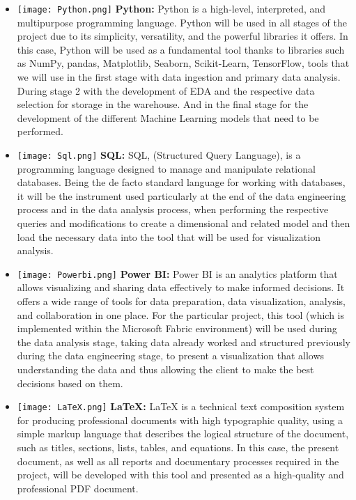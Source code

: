 \documentclass[12pt]{article}
\begin{document}
\begin{itemize}
    \item \texttt{[image: Python.png]}
    \textbf{Python:} Python is a high-level, interpreted, and multipurpose programming language.
    Python will be used in all stages of the project due to its simplicity, versatility, and the powerful libraries it offers. In this case, Python will be used as a fundamental tool thanks to libraries such as NumPy, pandas, Matplotlib, Seaborn, Scikit-Learn, TensorFlow, tools that we will use in the first stage with data ingestion and primary data analysis. During stage 2 with the development of EDA and the respective data selection for storage in the warehouse. And in the final stage for the development of the different Machine Learning models that need to be performed.
    
    \item \texttt{[image: Sql.png]}
    \textbf{SQL:} SQL, (Structured Query Language), is a programming language designed to manage and manipulate relational databases. Being the de facto standard language for working with databases, it will be the instrument used particularly at the end of the data engineering process and in the data analysis process, when performing the respective queries and modifications to create a dimensional and related model and then load the necessary data into the tool that will be used for visualization analysis.
    
    \item \texttt{[image: Powerbi.png]}
    \textbf{Power BI:} Power BI is an analytics platform that allows visualizing and sharing data effectively to make informed decisions. It offers a wide range of tools for data preparation, data visualization, analysis, and collaboration in one place. For the particular project, this tool (which is implemented within the Microsoft Fabric environment) will be used during the data analysis stage, taking data already worked and structured previously during the data engineering stage, to present a visualization that allows understanding the data and thus allowing the client to make the best decisions based on them.
    
    \item \texttt{[image: LaTeX.png]}
    \textbf{\LaTeX{}:} LaTeX is a technical text composition system for producing professional documents with high typographic quality, using a simple markup language that describes the logical structure of the document, such as titles, sections, lists, tables, and equations.
    In this case, the present document, as well as all reports and documentary processes required in the project, will be developed with this tool and presented as a high-quality and professional PDF document.
    

\end{itemize}
\end{document}
